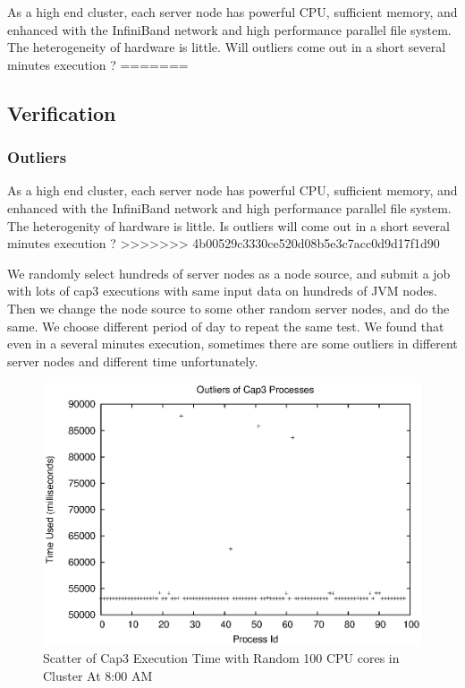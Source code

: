As a high end cluster, each server node has powerful CPU, sufficient memory, and enhanced with the InfiniBand network and high performance parallel file system. The heterogeneity of hardware is little. Will outliers come out in a short several minutes execution ?
=======
\subsection{Verification}

\subsubsection{Outliers}
As a high end cluster, each server node has powerful CPU, sufficient memory, and enhanced with the InfiniBand network and high performance parallel file system. The heterogenity of hardware is little. Is outliers will come out in a short several minutes execution ?
>>>>>>> 4b00529c3330ce520d08b5e3c7acc0d9d17f1d90

We randomly select hundreds of server nodes as a node source, and submit a job with lots of cap3 executions with same input data on hundreds of JVM nodes. Then we change the node source to some other random server nodes, and do the same. We choose different period of day to repeat the same test. We found that even in a several minutes execution, sometimes there are some outliers in different server nodes and different time unfortunately.

\begin{figure}
\centering
\includegraphics[width=0.9\columnwidth]{figures/outliers.eps}
\caption{Scatter of Cap3 Execution Time with Random 100 CPU cores in Cluster At 8:00 AM}
\label{figure:outlier}
\end{figure}

